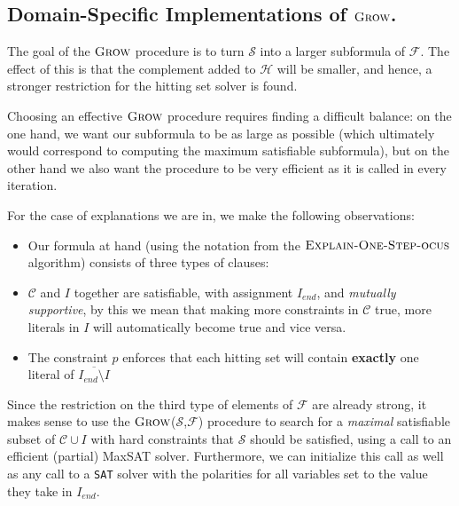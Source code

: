 \documentclass[twoside,11pt]{article}
\newcommand\m[1]{\mathcal{#1}}
\newcommand\setstohit{\ensuremath{\m{H} }\xspace}
\newcommand\F{\ensuremath{\m{F} }\xspace}
\newcommand\Iend{\ensuremath{I_\mathit{end} }\xspace}
\newcommand\formula{\ensuremath{\m{F} }\xspace}
\newcommand\formulac{\ensuremath{\m{C} }\xspace}
\newcommand\mm[1]{\ensuremath{#1}\xspace}
\newcommand\call[1]{\mm{\textsc{#1}}}
\newcommand\sat{\texttt{{SAT}}\xspace}
\newcommand\grow{\mm{\call{Grow}}}
\newcommand\maxsat{MaxSAT\xspace}
\newcommand\onestepo{\ensuremath{\call{Explain-One-Step-ocus}} \xspace}
\begin{document}
\subsection{Domain-Specific Implementations of \grow.} \label{para:domainspecificgrow}

The goal of the \grow procedure is to turn $\m{S}$ into a larger subformula of $\formula$. The effect of this is that the complement added to \setstohit will be smaller, and hence, a stronger restriction for the hitting set solver is found.  

Choosing an effective \grow procedure requires finding a difficult balance: on the one hand, we want our subformula to be as large as possible (which ultimately would correspond to computing the maximum satisfiable subformula), %
but on the other hand we also want the procedure to be very efficient as it is called in every iteration. 

For the case of explanations we are in, we make the following observations: 
\begin{itemize}
\item Our formula at hand (using the notation from the \onestepo algorithm) consists of three types of clauses: 
\item $\formulac$ and $I$ together are satisfiable, with assignment $I_{end}$, and \emph{mutually supportive}, by this we mean that making more constraints in \formulac true, more literals in $I$ will automatically become true and vice versa. 
\item The constraint $p$ enforces that each hitting set will contain \textbf{exactly} one literal of  $\overline{\Iend\setminus I}$
\end{itemize}
Since the restriction on the third type of elements of $\formula$ are already strong, it makes sense to use the \grow($\m{S}$,$\F$) procedure to search for a \emph{maximal} satisfiable subset of $\formulac\cup I$ with hard constraints that $\m{S}$ should be satisfied, using a call to an efficient  (partial) \maxsat solver. Furthermore, we can initialize this call as well as any call to a \sat solver with the polarities for all variables set to the value they take in $\Iend$. %
\end{document}
